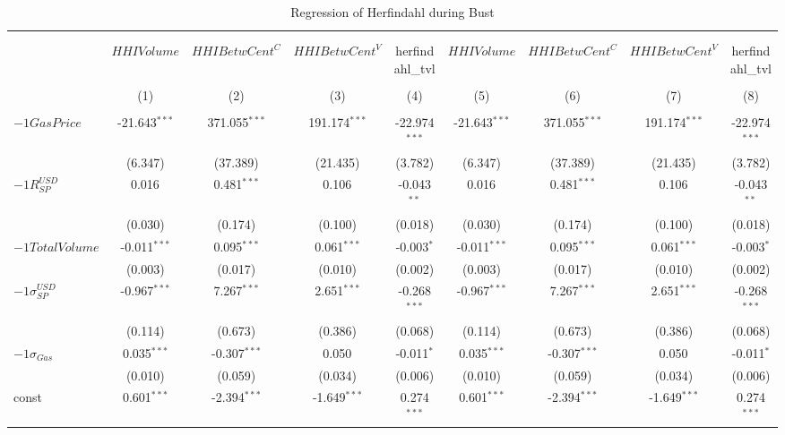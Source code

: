 \begin{table}[!htbp] \centering
  \caption{Regression of Herfindahl during Bust}
\begin{tabular}{@{\extracolsep{5pt}}lcccccccc}
\\[-1.8ex]\hline
\hline \\[-1.8ex]
\\[-1.8ex] & \multicolumn{1}{c}{${	 HHIVolume}$} & \multicolumn{1}{c}{${	 HHIBetwCent}^C$} & \multicolumn{1}{c}{${	 HHIBetwCent}^V$} & \multicolumn{1}{c}{herfindahl_tvl} & \multicolumn{1}{c}{${	 HHIVolume}$} & \multicolumn{1}{c}{${	 HHIBetwCent}^C$} & \multicolumn{1}{c}{${	 HHIBetwCent}^V$} & \multicolumn{1}{c}{herfindahl_tvl}  \\
\\[-1.8ex] & (1) & (2) & (3) & (4) & (5) & (6) & (7) & (8) \\
\hline \\[-1.8ex]
 ${	-1 GasPrice}$ & -21.643$^{***}$ & 371.055$^{***}$ & 191.174$^{***}$ & -22.974$^{***}$ & -21.643$^{***}$ & 371.055$^{***}$ & 191.174$^{***}$ & -22.974$^{***}$ \\
  & (6.347) & (37.389) & (21.435) & (3.782) & (6.347) & (37.389) & (21.435) & (3.782) \\
 ${	-1 R}^{USD}_{SP}$ & 0.016$^{}$ & 0.481$^{***}$ & 0.106$^{}$ & -0.043$^{**}$ & 0.016$^{}$ & 0.481$^{***}$ & 0.106$^{}$ & -0.043$^{**}$ \\
  & (0.030) & (0.174) & (0.100) & (0.018) & (0.030) & (0.174) & (0.100) & (0.018) \\
 ${	-1 TotalVolume}$ & -0.011$^{***}$ & 0.095$^{***}$ & 0.061$^{***}$ & -0.003$^{*}$ & -0.011$^{***}$ & 0.095$^{***}$ & 0.061$^{***}$ & -0.003$^{*}$ \\
  & (0.003) & (0.017) & (0.010) & (0.002) & (0.003) & (0.017) & (0.010) & (0.002) \\
 ${	-1 \sigma}^{USD}_{SP}$ & -0.967$^{***}$ & 7.267$^{***}$ & 2.651$^{***}$ & -0.268$^{***}$ & -0.967$^{***}$ & 7.267$^{***}$ & 2.651$^{***}$ & -0.268$^{***}$ \\
  & (0.114) & (0.673) & (0.386) & (0.068) & (0.114) & (0.673) & (0.386) & (0.068) \\
 ${	-1 \sigma}_{Gas}$ & 0.035$^{***}$ & -0.307$^{***}$ & 0.050$^{}$ & -0.011$^{*}$ & 0.035$^{***}$ & -0.307$^{***}$ & 0.050$^{}$ & -0.011$^{*}$ \\
  & (0.010) & (0.059) & (0.034) & (0.006) & (0.010) & (0.059) & (0.034) & (0.006) \\
 const & 0.601$^{***}$ & -2.394$^{***}$ & -1.649$^{***}$ & 0.274$^{***}$ & 0.601$^{***}$ & -2.394$^{***}$ & -1.649$^{***}$ & 0.274$^{***}$ \\

\end{tabular}
\end{table}
